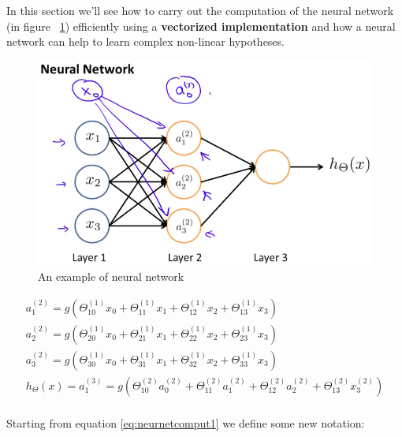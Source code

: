 In this section we'll see how to carry out the computation of the neural network (in figure ~\ref{neurnet1}) efficiently using a {\bf vectorized implementation} and how a neural network can help to learn complex non-linear hypotheses.



\begin{figure}[H]
\begin{center}
\includegraphics[scale=0.25]{images/neurnet}
\end{center}
\caption{An example of neural network} 
\label{neurnet1}
\end{figure}

\begin{eqfloat}[H]
\begin{equation}
	\begin{aligned}
	a_1^{(2)}  = g(\Theta_{10}^{(1)}x_0 + \Theta_{11}^{(1)}x_1 +  \Theta_{12}^{(1)}x_2 + \Theta_{13}^{(1)}x_3 )\\
	a_2^{(2)}  = g(\Theta_{20}^{(1)}x_0 + \Theta_{21}^{(1)}x_1 +  \Theta_{22}^{(1)}x_2 + \Theta_{23}^{(1)}x_3 )\\
	a_3^{(2)}  = g(\Theta_{30}^{(1)}x_0 + \Theta_{31}^{(1)}x_1 +  \Theta_{32}^{(1)}x_2 + \Theta_{33}^{(1)}x_3 )\\
	h_{\Theta}(x)  =  a_1^{(3)} =  g(\Theta_{10}^{(2)}a_0^{(2)} + \Theta_{11}^{(2)}a_1^{(2)} +  \Theta_{12}^{(2)}a_2^{(2)}+ \Theta_{13}^{(2)}x_3^{(2)} )\\
	\end{aligned}	
\end{equation}
      \addtocounter{equation}{-1}
        \caption{ Neural Network computation}
        \label{eq:neurnetcomput1}
    \end{eqfloat}

Starting from equation \ref{eq:neurnetcomput1} we define some new notation:

